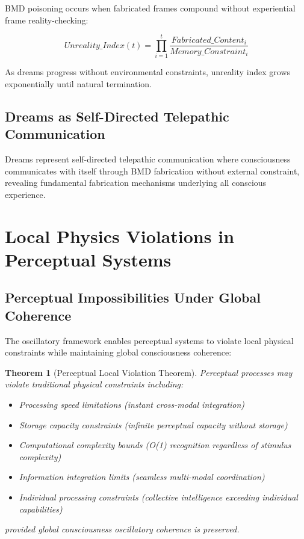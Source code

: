 \documentclass[12pt,a4paper]{article}
\newtheorem{theorem}{Theorem}
\begin{document}
BMD poisoning occurs when fabricated frames compound without experiential frame reality-checking:

\begin{equation}
Unreality\_Index(t) = \prod_{i=1}^{t} \frac{Fabricated\_Content_i}{Memory\_Constraint_i}
\end{equation}

As dreams progress without environmental constraints, unreality index grows exponentially until natural termination.

\subsection{Dreams as Self-Directed Telepathic Communication}

Dreams represent self-directed telepathic communication where consciousness communicates with itself through BMD fabrication without external constraint, revealing fundamental fabrication mechanisms underlying all conscious experience.

\section{Local Physics Violations in Perceptual Systems}

\subsection{Perceptual Impossibilities Under Global Coherence}

The oscillatory framework enables perceptual systems to violate local physical constraints while maintaining global consciousness coherence:

\begin{theorem}[Perceptual Local Violation Theorem]
Perceptual processes may violate traditional physical constraints including:
\begin{itemize}
\item Processing speed limitations (instant cross-modal integration)
\item Storage capacity constraints (infinite perceptual capacity without storage)
\item Computational complexity bounds (O(1) recognition regardless of stimulus complexity)
\item Information integration limits (seamless multi-modal coordination)
\item Individual processing constraints (collective intelligence exceeding individual capabilities)
\end{itemize}
provided global consciousness oscillatory coherence is preserved.
\end{theorem}
\end{document}
